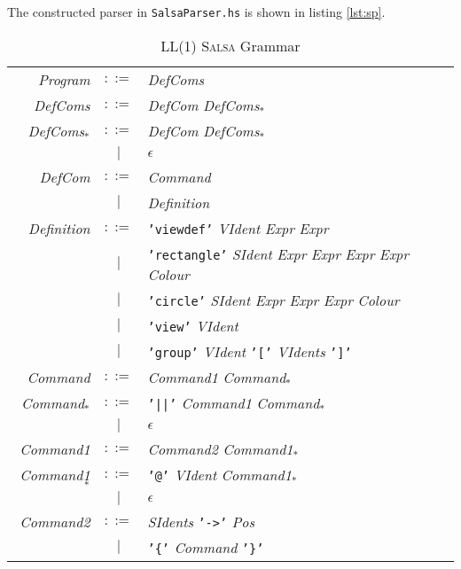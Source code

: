 \documentclass[
paper=a4,
oneside,
fontsize=11pt,
numbers=noenddot,
headinclude=false, %
footinclude=false, %
fleqn,             %
DIV=8
]{scrartcl}
\begin{document}
The constructed parser in {\tt SalsaParser.hs} is shown in listing \ref{lst:sp}.
\begin{table}[h]
  \centering\regnum
  \caption{{\regnum LL(1)} {\scshape Salsa} Grammar}\label{grammar}
  \begin{tabularx}{\textwidth}{rcX} \toprule
    {\em Program}    & $::=$ & {\em DefComs}\\
    {\em DefComs}    & $::=$ & {\em DefCom} {\em DefComs$_{*}$}\\
    {\em DefComs$_{*}$}   & $::=$ & {\em DefCom} {\em DefComs$_{*}$}\\
               & $|$   & $\epsilon$\\
    {\em DefCom}     & $::=$ & {\em Command}\\
               & $|$   & {\em Definition}\\
    {\em Definition} & $::=$ & {\tt 'viewdef'} {\em VIdent} {\em Expr} {\em Expr}\\
               & $|$   & {\tt 'rectangle'} {\em SIdent} {\em Expr} {\em Expr} {\em Expr} {\em Expr} {\em Colour}\\
               & $|$   & {\tt 'circle'} {\em SIdent} {\em Expr} {\em Expr} {\em Expr} {\em Colour}\\
               & $|$   & {\tt 'view'} {\em VIdent}\\
               & $|$   & {\tt 'group'} {\em VIdent} {\tt '['} {\em VIdents} {\tt ']'}\\
    {\em Command}    & $::=$ & {\em Command1} {\em Command$_{*}$}\\
    {\em Command$_{*}$}    & $::=$ & {\tt '||'} {\em Command1} {\em Command$_{*}$}\\
               & $|$ & $\epsilon$ \\
    {\em Command1}    & $::=$ & {\em Command2} {\em Command1$_{*}$}\\
    {\em Command1$_{*}$}    & $::=$ & {\tt '@'} {\em VIdent} {\em Command1$_{*}$}\\
               & $|$ & $\epsilon$ \\
    {\em Command2}    & $::=$ & {\em SIdents} {\tt '->'} {\em Pos}\\
               & $|$   & {\tt '\{'} {\em Command} {\tt '\}'}\\


\end{tabularx}
\end{table}
\end{document}

